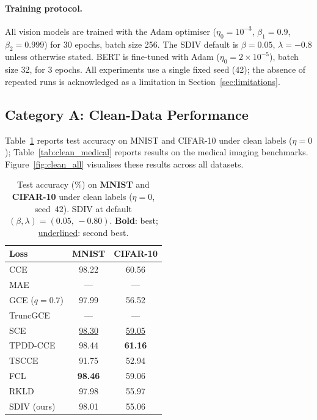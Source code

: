 \paragraph{Training protocol.}
All vision models are trained with the Adam optimiser ($\eta_0{=}10^{-3}$,
$\beta_1{=}0.9$, $\beta_2{=}0.999$) for 30 epochs, batch size 256.
The SDIV default is $\beta{=}0.05$, $\lambda{=}{-0.8}$ unless otherwise stated.
BERT is fine-tuned with Adam ($\eta_0{=}2{\times}10^{-5}$), batch size 32,
for 3 epochs.
All experiments use a single fixed seed (42); the absence of repeated runs
is acknowledged as a limitation in Section~\ref{sec:limitations}.

\subsection{Category A: Clean-Data Performance}
\label{sec:clean}

Table~\ref{tab:clean_mnist_cifar} reports test accuracy on MNIST and CIFAR-10
under clean labels ($\eta{=}0$); Table~\ref{tab:clean_medical} reports results
on the medical imaging benchmarks. Figure~\ref{fig:clean_all} visualises
these results across all datasets.

\begin{table}[t]
\centering
\caption{Test accuracy (\%) on \textbf{MNIST} and \textbf{CIFAR-10} under
clean labels ($\eta{=}0$, seed~42).
SDIV at default $(\beta,\lambda){=}(0.05,\,-0.80)$.
\textbf{Bold}: best; \underline{underlined}: second best.}
\label{tab:clean_mnist_cifar}
\small
\begin{tabular}{@{}lcc@{}}
\toprule
\textbf{Loss} & \textbf{MNIST} & \textbf{CIFAR-10} \\
\midrule
CCE             & 98.22              & 60.56              \\
MAE             & ---                & ---                \\
GCE ($q{=}0.7$) & 97.99             & 56.52              \\
TruncGCE        & ---                & ---                \\
SCE             & \underline{98.30}  & \underline{59.05}  \\
TPDD-CCE        & 98.44              & \textbf{61.16}     \\
TSCCE           & 91.75              & 52.94              \\
FCL             & \textbf{98.46}     & 59.06              \\
RKLD            & 97.98              & 55.97              \\
SDIV (ours)     & 98.01              & 55.06              \\
\bottomrule
\end{tabular}
\end{table}

